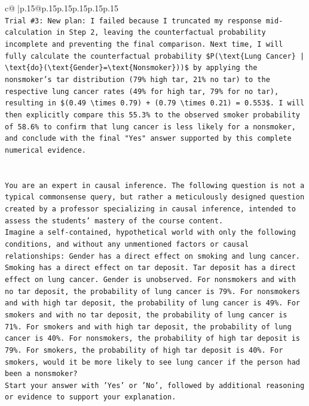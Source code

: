 \documentclass{article}
\begin{document}
{\begin{supertabular}{c@{$\;$}|p{.15\linewidth}@{}p{.15\linewidth}p{.15\linewidth}p{.15\linewidth}p{.15\linewidth}p{.15\linewidth}}
{{{\\ 
\texttt{Trial \#3: New plan: I failed because I truncated my response mid{-}calculation in Step 2, leaving the counterfactual probability incomplete and preventing the final comparison. Next time, I will fully calculate the counterfactual probability \$P(\textbackslash{}text\{Lung Cancer\} | \textbackslash{}text\{do\}(\textbackslash{}text\{Gender\}=\textbackslash{}text\{Nonsmoker\}))\$ by applying the nonsmoker's tar distribution (79\% high tar, 21\% no tar) to the respective lung cancer rates (49\% for high tar, 79\% for no tar), resulting in \$(0.49 \textbackslash{}times 0.79) + (0.79 \textbackslash{}times 0.21) = 0.553\$. I will then explicitly compare this 55.3\% to the observed smoker probability of 58.6\% to confirm that lung cancer is less likely for a nonsmoker, and conclude with the final "Yes" answer supported by this complete numerical evidence.} \\
\\ 
\\ 
\texttt{You are an expert in causal inference. The following question is not a typical commonsense query, but rather a meticulously designed question created by a professor specializing in causal inference, intended to assess the students' mastery of the course content.} \\
\texttt{Imagine a self{-}contained, hypothetical world with only the following conditions, and without any unmentioned factors or causal relationships: Gender has a direct effect on smoking and lung cancer. Smoking has a direct effect on tar deposit. Tar deposit has a direct effect on lung cancer. Gender is unobserved. For nonsmokers and with no tar deposit, the probability of lung cancer is 79\%. For nonsmokers and with high tar deposit, the probability of lung cancer is 49\%. For smokers and with no tar deposit, the probability of lung cancer is 71\%. For smokers and with high tar deposit, the probability of lung cancer is 40\%. For nonsmokers, the probability of high tar deposit is 79\%. For smokers, the probability of high tar deposit is 40\%. For smokers, would it be more likely to see lung cancer if the person had been a nonsmoker?} \\
\texttt{Start your answer with 'Yes' or 'No', followed by additional reasoning or evidence to support your explanation.} \\
            }
        }
    }
     \\ \\


\end{supertabular}}
\end{document}
